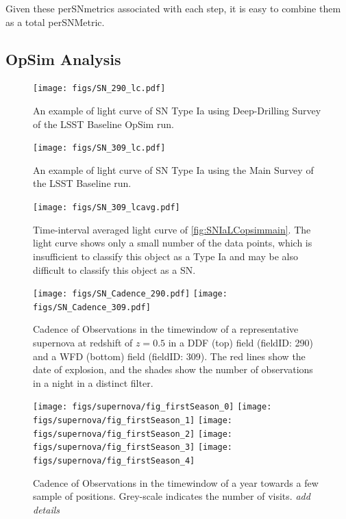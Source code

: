 Given these perSNmetrics associated with each step, it is easy to combine them
as a total perSNMetric.


\subsection{OpSim Analysis}
\label{sec:\secname:analysis}




\begin{figure}[tbh!]
\texttt{[image: figs/SN\_290\_lc.pdf]}
\caption{An example of light curve of SN Type Ia using Deep-Drilling
Survey of the LSST Baseline OpSim run.
}
\label{fig:SNIaLCopsimdeep}
\end{figure}



\begin{figure}[tbh!]
\texttt{[image: figs/SN\_309\_lc.pdf]}
\caption{An example of light curve of SN Type Ia using the Main Survey
of the LSST Baseline \OpSim run.}
\label{fig:SNIaLCopsimmain}
\end{figure}

\begin{figure}[tbh!]
\texttt{[image: figs/SN\_309\_lcavg.pdf]}
\caption{Time-interval averaged light curve of
\autoref{fig:SNIaLCopsimmain}. The light curve shows only a small number
of the data points, which is insufficient to classify this object as a
Type Ia and may be also difficult to classify this object as a SN. }
\label{fig:SNIaLCopsimmain2}
\end{figure}



\begin{figure}[tbh!]
\texttt{[image: figs/SN\_Cadence\_290.pdf]}
\texttt{[image: figs/SN\_Cadence\_309.pdf]}
\caption{Cadence of Observations in the timewindow of a representative
supernova at redshift of $z=0.5$ in a DDF (top) field (fieldID: 290) and
a WFD (bottom) field (fieldID: 309). The red lines show the date of
explosion, and the shades show the number of observations in a night in
a distinct filter.}
\label{fig:perSNCadence}
\end{figure}



\begin{figure}[!hb]
    \begin{minipage}[b]{\linewidth}
        \texttt{[image: figs/supernova/fig\_firstSeason\_0]}
        \texttt{[image: figs/supernova/fig\_firstSeason\_1]}
        \texttt{[image: figs/supernova/fig\_firstSeason\_2]}
        \texttt{[image: figs/supernova/fig\_firstSeason\_3]}
        \texttt{[image: figs/supernova/fig\_firstSeason\_4]}
    \end{minipage}
\label{fig:opsimSummary}
\caption{Cadence of Observations in the timewindow of a year towards a few sample of
positions. Grey-scale indicates the number of visits. {\it add details}
}
\end{figure}


